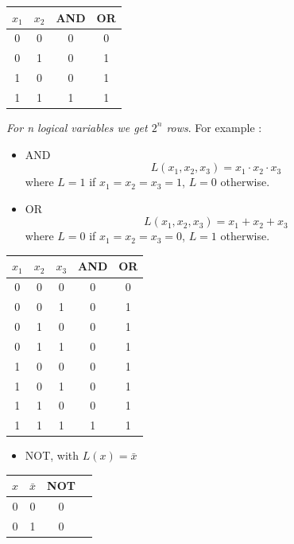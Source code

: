 \documentclass[12pt,openany, tikz,border=10pt]{book}
\begin{document}
  \begin{center}
  \begin{tabular}{ c c | c | c }
      \( x_1 \) & \( x_2 \) & AND & OR \\
      \hline
      0 & 0 & 0 & 0 \\
      0 & 1 & 0 & 1 \\
      1 & 0 & 0 & 1 \\
      1 & 1 & 1 & 1 \\
      
  \end{tabular}
\end{center}


\textit{For n logical variables we get $2^n$ rows}.\newline
For example : 
\begin{itemize}
  \item[] AND
  \begin{equation*}
      L(x_1, x_2, x_3) = x_1 \cdot x_2 \cdot x_3
  \end{equation*}
  where \( L = 1 \) if \( x_1 = x_2 = x_3 = 1 \), \( L = 0 \) otherwise.
  
  \item[] OR
  \begin{equation*}
      L(x_1, x_2, x_3) = x_1 + x_2 + x_3
  \end{equation*}
  where \( L = 0 \) if \( x_1 = x_2 = x_3 = 0 \), \( L = 1 \) otherwise.
\end{itemize}

\begin{center}
\begin{tabular}{ c c c | c | c }

  \( x_1 \) & \( x_2 \) & \( x_3 \) & AND & OR \\
  \hline
  0 & 0 & 0 & 0 & 0 \\
  0 & 0 & 1 & 0 & 1 \\
  0 & 1 & 0 & 0 & 1 \\
  0 & 1 & 1 & 0 & 1 \\
  1 & 0 & 0 & 0 & 1 \\
  1 & 0 & 1 & 0 & 1 \\
  1 & 1 & 0 & 0 & 1 \\
  1 & 1 & 1 & 1 & 1 \\
\end{tabular}
\end{center}
\begin{itemize}
\item[] NOT, with $L(x) = \bar{x}$      
\end{itemize}
\begin{center}
    \begin{tabular}{ c c | c | c }
        \( x \) & \( \bar{x} \) & NOT \\
        \hline
        0 & 0 & 0 \\
        0 & 1 & 0 \\
    \end{tabular}
  \end{center}
\end{document}
